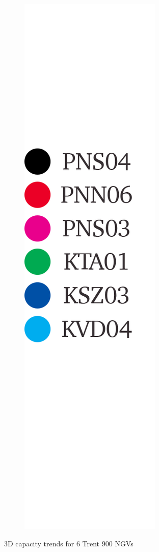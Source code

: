 \documentclass[a4paper, 11pt, oneside]{report}
\begin{document}
\begin{figure}[H]
\begin{subfigure}{.1125\textwidth}
		\includegraphics[width=\linewidth]{figs/t900_2d_capacity_trends_legend.png}
	\end{subfigure}
	\caption{3D capacity trends for 6 Trent 900 NGVs}
	\label{fig:t900_3d_capacity_trends}
\end{figure}
\end{document}

